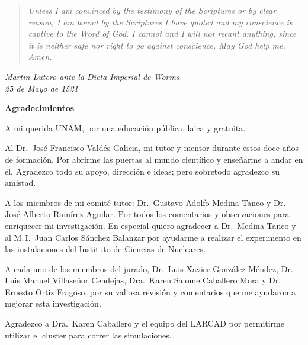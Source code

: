 
\newpage
\thispagestyle{empty}
\vspace*{\fill}

\newpage
\thispagestyle{empty}
\vspace*{\fill}

\begin{verse}

\noindent\emph{Unless I am convinced by the testimony of the Scriptures or by clear reason, I am bound by the Scriptures I have quoted and my conscience is captive to the Word of God. I cannot and I will not recant anything, since it is neither safe nor right to go against conscience. May God help me. Amen.}

\end{verse}

\begin{flushright}
\emph{Martin Lutero ante la Dieta Imperial de Worms}\\
\emph{25 de Mayo de 1521}
\end{flushright}
\vspace*{\fill}

\newpage
\thispagestyle{empty}
\vspace*{\fill}
\begin{center}
\textbf{\Large{Agradecimientos}}
\end{center}

A mi querida UNAM, por una educación pública, laica y gratuita.

Al Dr.\, José Francisco Valdés-Galicia, mi tutor y mentor durante estos doce años de formación. Por abrirme las puertas al mundo científico y enseñarme a andar en él. Agradezco todo su apoyo, dirección e ideas; pero sobretodo agradezco su amistad.

A los miembros de mi comité tutor: Dr.\, Gustavo Adolfo Medina-Tanco y Dr.\, José Alberto Ramírez Aguilar. Por todos los comentarios y observaciones para enriquecer mi investigación. En especial quiero agradecer a Dr.\, Medina-Tanco y al M.\,I.\, Juan Carlos Sánchez Balanzar por ayudarme a realizar el experimento en las instalaciones del Instituto de Ciencias de Nucleares.

A cada uno de los miembros del jurado, Dr.\, Luis Xavier González Méndez, Dr.\, Luis Manuel Villaseñor Cendejas, Dra.\, Karen Salome Caballero Mora y Dr.\, Ernesto Ortiz Fragoso, por su valiosa revisión y comentarios que me ayudaron a mejorar esta investigación.

Agradezco a Dra.\, Karen Caballero y el equipo del LARCAD por permitirme utilizar el cluster para correr las simulaciones.

